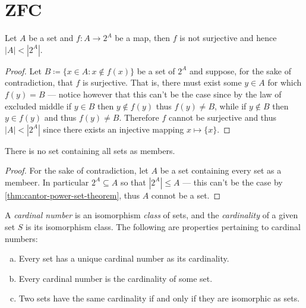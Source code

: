 \section{ZFC}

\begin{theorem}[Cantor]
\label{thm:cantor-power-set-theorem}
Let \(A\) be a set and \(f: A \to 2^A\) be a map, then \(f\) is not surjective
and hence \(|A| < |2^A|\).
\end{theorem}

\begin{proof}
Let \(B \coloneq \{x \in A \colon x \notin f(x)\}\) be a set of \(2^A\) and
suppose, for the sake of contradiction, that \(f\) is surjective. That is,
there must exist some \(y \in A\) for which \(f(y) = B\) --- notice however that
this can't be the case since by the law of excluded middle if \(y \in B\) then
\(y \notin f(y)\) thus \(f(y) \neq B\), while if \(y \notin B\) then \(y \in
f(y)\) and thus \(f(y) \neq B\). Therefore \(f\) cannot be surjective and thus
\(|A| < |2^A|\) since there exists an injective mapping \(x \mapsto \{x\}\).
\end{proof}

\begin{theorem}
\label{thm:no-set-contains-all-sets}
There is no set containing all sets as members.
\end{theorem}

\begin{proof}
For the sake of contradiction, let \(A\) be a set containing every set as a
membeer. In particular \(2^A \subseteq A\) so that \(|2^A| \leq A\) --- this
can't be the case by \cref{thm:cantor-power-set-theorem}, thus \(A\) connot be a
set.
\end{proof}

\begin{definition}
\label{def:ordinal-cardinal}
A \emph{cardinal number} is an isomorphism \emph{class} of sets, and the
\emph{cardinality} of a given set \(S\) is its isomorphism class. The following
are properties pertaining to cardinal numbers:
\begin{enumerate}[(a)]\setlength\itemsep{0em}
\item Every set has a unique cardinal number as its cardinality.
\item Every cardinal number is the cardinality of some set.
\item Two sets have the same cardinality if and only if they are isomorphic as
  sets.
\end{enumerate}
\end{definition}


